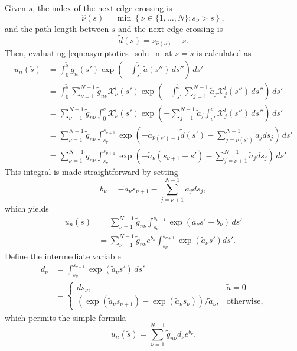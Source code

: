 Given $s$, the index of the next edge crossing is
\begin{equation*}
  \hat{\nu}(s) = \min\left\{ \nu \in \{1,\ldots,N\} : s_\nu>s \right\},
\end{equation*}
and the path length between $s$ and the next edge crossing is
\begin{equation*}
  \tilde{d}(s) = s_{\hat{\nu}(s)}-s.
\end{equation*}
Then, evaluating \eqref{eqn:asymptotics_soln_n} at $s=\tilde{s}$ is calculated as
\begin{align*}
  u_n(\tilde{s}) &= \int_0^{\tilde{s}}\tilde{g}_n(s')\exp\left( -\int_{s'}^{\tilde{s}}\tilde{a}(s'')\,ds'' \right)\, ds' \\
  &= \int_0^{\tilde{s}} \sum_{\nu=1}^{N-1}\tilde{g}_{n\nu}\mathcal{X}^l_\nu(s') \exp\left( -\int_{s'}^{\tilde{s}}\sum_{j=1}^{N-1}\tilde{a}_{j}\mathcal{X}^l_j(s'')\,ds'' \right)\, ds' \\
  &= \sum_{\nu=1}^{N-1}\tilde{g}_{n\nu}\int_0^{\tilde{s}} \mathcal{X}^l_\nu(s') \exp\left( -\sum_{j=1}^{N-1}\tilde{a}_{j}\int_{s'}^{\tilde{s}}\mathcal{X}^l_j(s'')\,ds'' \right)\, ds' \\
  &= \sum_{\nu=1}^{N-1}\tilde{g}_{n\nu}\int_{s_\nu}^{s_{\nu+1}}  \exp\left(-\tilde{a}_{\hat{\nu}(s')-1}\tilde{d}(s') -\sum_{j=\hat{\nu}(s')}^{N-1}\tilde{a}_{j}ds_j\right)\, ds' \\
  &= \sum_{\nu=1}^{N-1}\tilde{g}_{n\nu}\int_{s_\nu}^{s_{\nu+1}}  \exp\left(-\tilde{a}_{\nu}(s_{\nu+1}-s') -\sum_{j=\nu+1}^{N-1}\tilde{a}_{j}ds_j\right)\, ds'.
\end{align*}
This integral is made straightforward by setting
\begin{equation*}
  b_\nu = -\tilde{a}_{\nu}s_{\nu+1} - \sum_{j=\nu+1}^{N-1}\tilde{a}_{j}ds_j,
\end{equation*}
which yields
\begin{align*}
  u_n(\tilde{s}) &= \sum_{\nu=1}^{N-1}\tilde{g}_{n\nu}\int_{s_\nu}^{s_{\nu+1}}  \exp\left(\tilde{a}_{\nu}s' + b_\nu\right)\, ds' \\
                 &= \sum_{\nu=1}^{N-1}\tilde{g}_{n\nu}e^{b_\nu}\int_{s_\nu}^{s_{\nu+1}}  \exp\left(\tilde{a}_{\nu}s'\right) ds'.
\end{align*}
Define the intermediate variable
\begin{align*}
  d_\nu &= \int_{s_\nu}^{s_{\nu+1}}  \exp\left(\tilde{a}_{\nu}s'\right)\, ds' \\
    &= \begin{cases}
    ds_\nu, & \tilde{a} = 0 \\
      \left( \exp(\tilde{a}_\nu s_{\nu+1}) - \exp(\tilde{a}_\nu s_\nu) \right)/\tilde{a}_\nu, & \mbox{otherwise},
    \end{cases}
\end{align*}
which permits the simple formula
\begin{equation}
  u_n(\tilde{s}) = \sum_{\nu=1}^{N-1} \tilde{g}_{n\nu}d_\nu e^{b_\nu}.
  \label{eqn:discrete_ray_integral}
\end{equation}


